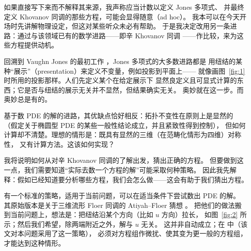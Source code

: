 
如果直接写下来而不解释其来源，我声称应当计数以定义 Jones 多项式、
并最终定义 Khovanov 同调的那些方程，可能会显得随意（ad hoc）。
我本可以在今天开场时先讲解物理设定，但这对某些听众未必有帮助。
于是我决定改用另一条进路：通过与该领域已有的数学进路——即辛 Khovanov 同调
\cite{SS,Manolescu,AS}——作比较，来为这些方程提供动机。


回溯到 Vaughn Jones 的最初工作 \cite{Jones}，Jones 多项式的大多数进路都是
用纽结的某种“展示”（presentation）来定义不变量，例如投影到平面上——
就像画图~\ref{fig:1} 时所用的投影那样。人们先定义某个在给定展示下
显然良定义且可显式计算的东西；它是否与纽结的展示无关并不显然，但结果确实无关。
奥妙就在这一步。而奥妙总是有的。


基于数 PDE 的解的进路，其优缺点恰好相反：拓扑不变性在原则上是显然的
（假定关于椭圆型 PDE 的某些一般性结论成立，并且紧致性得到控制），
但如何计算却不清楚。理想的情形是：既具有显然的三维（在范畴化情形为四维）对称性，
又有计算方法。这该如何实现？


我将说明如何从对辛 Khovanov 同调的了解出发，猜出正确的方程。
但要做到这一点，我们需要知道“实际去数一个方程的解”可能采取何种策略。
因此我先解释：假如已经知道要分析哪些方程，我们会怎么做——这会有助于我们猜出方程。

有一个标准的策略，适用于当前问题，可以在适当条件下尝试数出 PDE 的解。
其原始版本是关于三维流形 Floer 同调的 Atiyah--Floer 猜想 \cite{Atiyah}。
把他们的做法搬到当前问题上，想法是：把纽结沿某个方向（比如 $u$ 方向）拉长，
如图~\ref{fig:2} 所示；然后我们希望，除两端附近之外，解与 $u$ 无关。
这并非自动成立；在 \cite{GW} 中（该文对本问题采用了这一策略），
必须对方程组作微扰、使其变为更一般的方程组，才能达到这种情形。

